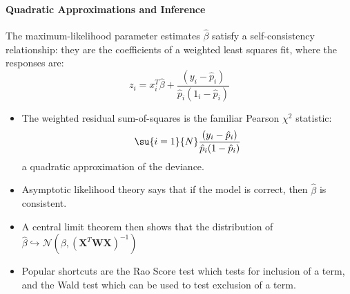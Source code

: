 \paragraph{Quadratic Approximations and Inference}
The maximum-likelihood parameter estimates $\hat{\beta}$ satisfy a self-consistency relationship:
they are the coefficients of a weighted least squares fit, where the responses are:
$$ z_{i} = x_{i}^{T}\hat{\beta} + \frac{(y_{i}-\hat{p}_{i})}{\hat{p}_{i}(1_{i}-\hat{p}_{i})}$$

\begin{itemize}
	\item The weighted residual sum-of-squares is the familiar Pearson $\chi^{2}$ statistic:
		$$ \su{{i=1}}{N}\dfrac{(y_{i}-\hat{p}_{i})}{\hat{p}_{i}(1-\hat{p}_{i})}$$ a 
		quadratic approximation of the deviance.
	\item Asymptotic likelihood theory says that if the model is correct, then $\hat{\beta}$
		is consistent.
	\item A central limit theorem then shows that the distribution of $\hat{\beta}
		\hookrightarrow \mathcal{N}\left(\beta,\left(\bm{X}^{T}\bm{W}\bm{X}\right)^{-1} 
		\right)$
	\item Popular shortcuts are the Rao Score test which tests for inclusion of a term, and 
		the Wald test which can be used to test exclusion of a term.
\end{itemize}
